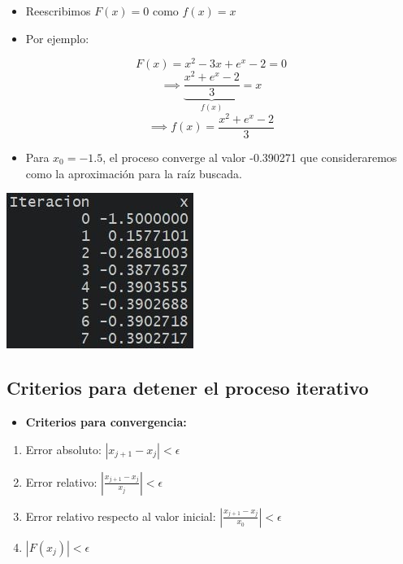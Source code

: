 \documentclass[openany]{book}
\providecommand{\tightlist}{%
  \setlength{\itemsep}{0pt}\setlength{\parskip}{0pt}}
\begin{document}
\begin{itemize}
\tightlist
\item
  Reescribimos \(F(x) = 0\) como \(f(x) = x\)
\item
  Por ejemplo:
\end{itemize}

\[F(x) = x^2-3x+e^x-2 = 0\]
\[\implies \underbrace{\frac{x^2+e^x-2}{3}}_{f(x)} = x \]
\[\implies f(x)= \frac{x^2+e^x-2}{3}\]

\begin{itemize}
\tightlist
\item
  Para \(x_0 = -1.5\), el proceso converge al valor -0.390271 que consideraremos como la aproximación para la raíz buscada.
\end{itemize}

\begin{center}\includegraphics[width=0.4\linewidth]{Plots/U2/rtdo1} \end{center}

\hypertarget{criterios-para-detener-el-proceso-iterativo}{%
\subsection{Criterios para detener el proceso iterativo}\label{criterios-para-detener-el-proceso-iterativo}}

\begin{itemize}
\tightlist
\item
  \textbf{Criterios para convergencia:}
\end{itemize}

\begin{enumerate}
\def\labelenumi{\arabic{enumi}.}
\item
  Error absoluto: \(|x_{j+1}-x_j| < \epsilon\)
\item
  Error relativo: \(\left|\frac{x_{j+1}-x_j}{x_j}\right| < \epsilon\)
\item
  Error relativo respecto al valor inicial: \(\left|\frac{x_{j+1}-x_j}{x_0}\right| < \epsilon\)
\item
  \(|F(x_j)| < \epsilon\)
\end{enumerate}
\end{document}
